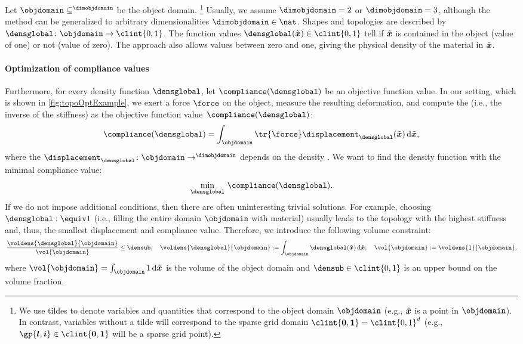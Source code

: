 Let $\objdomain \subset \real^{\dimobjdomain}$ be the object domain.%
\footnote{%
  We use tildes to denote variables and quantities
  that correspond to the object domain $\objdomain$
  (e.g., $\tilde{{\boldsymbol{x}}}$ is a point in $\objdomain$).
  In contrast, variables without a tilde will correspond
  to the sparse grid domain $\clint{\*0, \*1} = \clint{0, 1}^d$
  (e.g., $\gp{\*l,\*i} \in \clint{\*0, \*1}$ will be a sparse grid point).%
}
Usually, we assume $\dimobjdomain = 2$ or $\dimobjdomain = 3$,
although the method can be generalized to
arbitrary dimensionalities $\dimobjdomain \in \nat$.
Shapes and topologies are described by 
$\densglobal\colon \objdomain \to \clint{0, 1}$.
The function values $\densglobal(\tilde{\*x}) \in \clint{0, 1}$
tell if $\tilde{{\boldsymbol{x}}}$ is contained in the object (value of one) or
not (value of zero).
The  approach also allows values between
zero and one, giving the physical density of the material in $\tilde{{\boldsymbol{x}}}$.

\paragraph{Optimization of compliance values}

Furthermore, for every density function $\densglobal$,
let $\compliance(\densglobal)$ be an objective function value.
In our setting, which is shown in \cref{fig:topoOptExample},
we exert a force $\force$ on the object,
measure the resulting deformation, and
compute the  (i.e., the inverse of the stiffness) as
the objective function value~$\compliance(\densglobal)$:
\begin{equation}
  \compliance(\densglobal)
  = \int_{\objdomain} \tr{\force} \displacement_{\densglobal}(\tilde{\*x})
  \diff\tilde{\*x},
\end{equation}
where the 
$\displacement_{\densglobal}\colon \objdomain \to \real^{\dimobjdomain}$
depends on the density \cite{Huebner14Mehrdimensionale}.
We want to find the density function
with the minimal compliance value:
\begin{equation}
  \label{eq:topoOptProblemContinuous}
  \min_{\densglobal}\, \compliance(\densglobal).
\end{equation}
If we do not impose additional conditions,
then there are often uninteresting trivial solutions.
For example, choosing $\densglobal :\equiv 1$
(i.e., filling the entire domain $\objdomain$ with material)
usually leads to the topology with the
highest stiffness and, thus, the smallest displacement and compliance value.
Therefore, we introduce the following volume constraint:
\begin{equation}
  \frac{\voldens{\densglobal}{\objdomain}}{\vol{\objdomain}} \le \densub,\quad
  \voldens{\densglobal}{\objdomain}
  := \int_{\objdomain} \densglobal(\tilde{\*x}) \diff\tilde{\*x},\quad
  \vol{\objdomain}
  := \voldens{1}{\objdomain},
\end{equation}
where $\vol{\objdomain} = \int_{\objdomain} 1 \diff\tilde{\*x}$
is the volume of the object domain and
$\densub \in \clint{0, 1}$ is an upper bound on the volume fraction.

